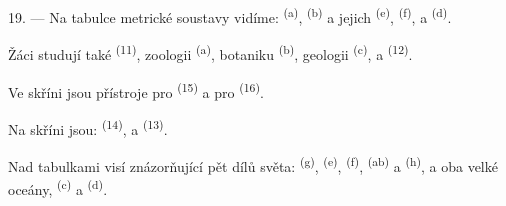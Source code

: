 19. --- Na tabulce metrické soustavy vidíme:  \textsuperscript{(a)},
 \textsuperscript{(b)} a jejich  
\textsuperscript{(e)},  \textsuperscript{(f)},  a
 \textsuperscript{(d)}.

Žáci studují také  \textsuperscript{(11)}, zoologii \textsuperscript{(a)},
botaniku \textsuperscript{(b)}, geologii \textsuperscript{(c)}, a 
\textsuperscript{(12)}.

Ve skříni jsou přístroje pro  \textsuperscript{(15)} a pro
 \textsuperscript{(16)}.

Na skříni jsou:  \textsuperscript{(14)},  a
 \textsuperscript{(13)}.

Nad tabulkami visí  znázorňující pět dílů světa: 
\textsuperscript{(g)},  \textsuperscript{(e)}, 
\textsuperscript{(f)},  \textsuperscript{(ab)} a 
\textsuperscript{(h)}, a oba velké oceány,  \textsuperscript{(c)} a
 \textsuperscript{(d)}.
\VUsaut{6.0mm}
\VUfilet{22mm}
